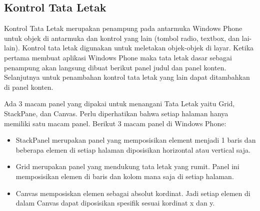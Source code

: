\subsection{Kontrol Tata Letak}
\label{subsec:Kontrol Tata Letak}
\hspace{0.5cm} Kontrol Tata Letak merupakan penampung pada antarmuka Windows Phone untuk objek di antarmuka dan kontrol yang lain (tombol radio, textbox, dan lai-lain). Kontrol tata letak digunakan untuk meletakan objek-objek di layar. Ketika pertama membuat aplikasi Windows Phone maka tata letak dasar sebagai penampung akan langsung dibuat berikut panel judul dan panel konten. Selanjutnya untuk penambahan kontrol tata letak yang lain dapat ditambahkan di panel konten.


\hspace{0.5cm} Ada 3 macam panel yang dipakai untuk menangani Tata Letak yaitu Grid, StackPane, dan Canvas. Perlu diperhatikan bahwa setiap halaman hanya memiliki satu macam panel. Berikut 3 macam panel di Windows Phone:

\begin{itemize}
	\item StackPanel merupakan panel yang memposisikan element menjadi 1 baris dan beberapa elemen di setiap halaman diposisikan horizontal atau vertical saja.
	\item Grid merupakan panel yang mendukung tata letak yang rumit. Panel ini memposisikan elemen di baris dan kolom mana saja di setiap halaman.
	\item Canvas memposiskan elemen sebagai absolut kordinat. Jadi setiap elemen di dalam Canvas dapat diposisikan spesifik sesuai kordinat x dan y.
\end{itemize}
	
